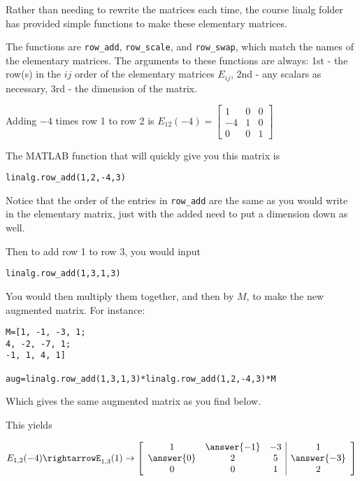 \documentclass{ximera}
\begin{document}
 
 \begin{remark}

 Rather than needing to rewrite the matrices each time, the course linalg folder has provided simple functions to make these elementary matrices.

The functions are \texttt{row\_add}, \texttt{row\_scale}, and \texttt{row\_swap}, which match the names of the elementary matrices. The arguments to these functions are always: 1st - the row(s) in the $ij$ order of the elementary matrices $E_{ij}$, 2nd - any scalars as necessary, 3rd - the dimension of the matrix. 


Adding $-4$ times row 1 to row 2 is 
$E_{12}(-4)=\begin{bmatrix}
1&0&0\\
-4&1&0\\
0&0&1
\end{bmatrix}$

The MATLAB function that will quickly give you this matrix is 

\begin{verbatim}
linalg.row_add(1,2,-4,3)
\end{verbatim}

Notice that the order of the entries in \texttt{row\_add} are the same as you would write in the elementary matrix, just with the added need to put a dimension down as well.

Then to add row 1 to row 3, you would input


\begin{verbatim}
linalg.row_add(1,3,1,3)
\end{verbatim}

You would then multiply them together, and then by $M$, to make the new augmented matrix. For instance:

\begin{verbatim}
M=[1, -1, -3, 1;
4, -2, -7, 1;
-1, 1, 4, 1]

aug=linalg.row_add(1,3,1,3)*linalg.row_add(1,2,-4,3)*M
\end{verbatim}

Which gives the same augmented matrix as you find below.

\end{remark}



 This yields

 $$
E_{1,2}(-4)\rightarrow%
E_{1,3}(1)\rightarrow%
\left[\begin{array}{ccc|c} 
  1&\answer{-1}&-3&1\\\answer{0}&2&5&\answer{-3}\\0&0&1&2
  \end{array}\right]
$$
\end{document}

